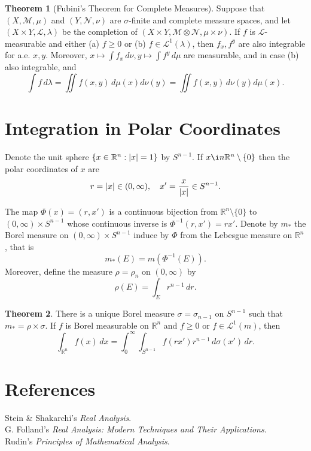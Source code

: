 \documentclass{article}
\theoremstyle{definition}
\newcommand{\R}{\mathbb{R}}
\newcommand{\lag}{\mathcal{L}}
\newcommand{\f}[2]{\frac{#1}{#2}}
\theoremstyle{theorem}
\newtheorem{theorem}{Theorem}[section]
\begin{document}
\begin{theorem}[Fubini's Theorem for Complete Measures]
Suppose that $(X,\mathcal{M},\mu)$ and $(Y,\mathcal{N},\nu)$ are $\sigma$-finite and complete measure spaces, and let $(X\times Y, \lag, \lambda)$ be the completion of $(X\times Y, \mathcal{M}\otimes \mathcal{N}, \mu\times \nu)$. If $f$ is $\lag$-measurable and either (a) $f\geq 0$ or (b) $f\in \lag^1(\lambda)$, then $f_x,f^y$ are also integrable for a.e. $x,y$. Moreover, $x\mapsto \int f_x\,d\nu, y\mapsto \int f^y\,d\mu$ are measurable, and in case (b) also integrable, and
\begin{equation*}
    \int f\,d\lambda = \iint f(x,y)\,d\mu(x)d\nu(y) = \iint f(x,y)\,d\nu(y)d\mu(x) .
\end{equation*}
\end{theorem}

\section{Integration in Polar Coordinates}

Denote the unit sphere $\{ x\in \R^n : \abs{x} = 1 \}$ by $S^{n-1}$. If $x\i n\R^n\setminus\{ 0\}$ then the polar coordinates of $x$ are
\begin{equation*}
    r = \abs{x}\in (0,\infty),\quad x' = \f{x}{\abs{x}} \in S^{n-1}.
\end{equation*}

The map $\Phi(x)=(r,x')$ is a continuous bijection from $\R^n\setminus\{ 0 \}$ to $(0,\infty)\times S^{n-1}$ whose continuous inverse is $\Phi^{-1}(r,x') = rx'$. Denote by $m_*$ the Borel measure on $(0,\infty) \times S^{n-1}$ induce by $\Phi$ from the Lebesgue measure on $\R^n$, that is 
\begin{equation*}
    m_*(E)  = m(\Phi^{-1}(E)).
\end{equation*}
Moreover, define the measure $\rho = \rho_n$ on $(0,\infty)$ by 
\begin{equation*}
    \rho(E) = \int_E r^{n-1} \,dr.
\end{equation*}


\begin{theorem}
There is a unique Borel measure $\sigma = \sigma_{n-1}$ on $S^{n-1}$ such that $m_* = \rho\times \sigma$. If $f$ is Borel measurable on $\R^n$ and $f\geq 0$ or $f\in \lag^{1}(m)$, then 
\begin{equation*}
    \int_{\R^n}f(x)\,dx = \int^\infty_{0}\int_{S^{n-1}} f(rx')r^{n-1}\,d\sigma(x')\,dr.
\end{equation*}
\end{theorem}




\section*{References}

\noindent [1] Stein \& Shakarchi's \textit{Real Analysis}.\\
\noindent [2] G. Folland's \textit{Real Analysis: Modern Techniques and Their Applications}.\\
\noindent [3] Rudin's \textit{Principles of Mathematical Analysis}.






	
\end{document}
